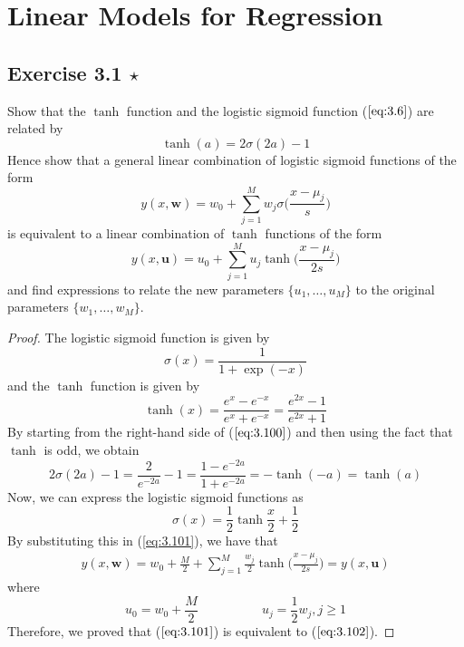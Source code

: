 \chapter{Linear Models for Regression}

\section*{Exercise 3.1 $\star$}
Show that the $\tanh$ function and the logistic
sigmoid function ($\ref{eq:3.6}$) are related by 
\begin{equation}\label{eq:3.100}\tag{3.100}
    \tanh(a) = 2\sigma(2a) - 1
\end{equation}
Hence show that a general linear combination of logistic sigmoid functions
of the form
\begin{equation}\label{eq:3.101}\tag{3.101}
    y(x, \mathbf{w}) = w_0 + \sum_{j=1}^{M} w_j \sigma\bigg(\frac{x-\mu_j}{s}\bigg)
\end{equation}
is equivalent to a linear combination of $\tanh$ functions of the form
\begin{equation}\label{eq:3.102}\tag{3.102}
    y(x, \mathbf{u}) = u_0 + \sum_{j=1}^{M} u_j \tanh\bigg(\frac{x-\mu_j}{2s}\bigg)
\end{equation}
and find expressions to relate the new parameters $\{u_1, \ldots, u_M\}$
to the original parameters $\{w_1, \ldots, w_M\}$.

\vspace{1em}

\begin{proof}
    The logistic sigmoid function is given by
    \begin{equation}\label{eq:3.6}\tag{3.6}
        \sigma(x) = \frac{1}{1 + \exp(-x)}
    \end{equation}
    and the $\tanh$ function is given by
    \begin{equation}
        \tanh(x) = \frac{e^x - e^{-x}}{e^x + e^{-x}} = \frac{e^{2x} - 1}{e^{2x} + 1}
    \end{equation}
    By starting from the right-hand side of ($\ref{eq:3.100}$) and then 
    using the fact that $\tanh$ is odd, we obtain 
    \begin{equation}\tag{3.100}
        2\sigma(2a) - 1 = \frac{2}{e^{-2a}} - 1 = \frac{1 - e^{-2a}}{1 + e^{-2a}}
        = -\tanh(-a) = \tanh(a)
    \end{equation}
    Now, we can express the logistic sigmoid functions as
    \[
        \sigma(x) = \frac{1}{2}\tanh\frac{x}{2} + \frac{1}{2}
    \] 
    By substituting this in (\ref{eq:3.101}), we have that
    \begin{align*}
        y(x, \mathbf{w}) = w_0 + \frac{M}{2} +  
        \sum_{j=1}^{M} \frac{w_j}{2} \tanh\bigg(\frac{x - \mu_j}{2s}\bigg)
        = y(x, \mathbf{u})
    \end{align*}
    where
    \[
        u_0 = w_0 + \frac{M}{2} 
        \hspace{5em}
        u_j = \frac{1}{2} w_j, j \geq 1
    \] 
    Therefore, we proved that ($\ref{eq:3.101}$) is equivalent to ($\ref{eq:3.102}$).
\end{proof}

